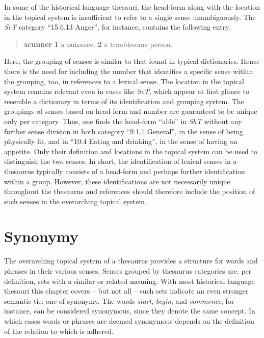 In some of the historical language thesauri, the head-form along with the location in the topical system is insufficient to refer to a single sense unambiguously. The \textit{ScT} category ``15.6.13 Anger'', for instance, contains the following entry:
\begin{quotation} \noindent
	\textbf{scunner} \textbf{1} a nuisance. \textbf{2} a troublesome person.
\end{quotation}
Here, the grouping of senses is similar to that found in typical dictionaries. Hence there is the need for including the number that identifies a specific sense within the grouping, too, in references to a lexical sense. The location in the topical system remains relevant even in cases like \textit{ScT}, which appear at first glance to resemble a dictionary in terms of its identification and grouping system. The groupings of senses based on head-form and number are guaranteed to be unique only per category. Thus, one finds the head-form ``able'' in \textit{ShT} without any further sense division in both category ``9.1.1 General'', in the sense of being physically fit, and in ``10.4 Eating and drinking'', in the sense of having an appetite. Only their definition and locations in the topical system can be used to distinguish the two senses. In short, the identification of lexical senses in a thesaurus typically consists of a head-form and perhaps further identification within a group. However, these identifications are not necessarily unique throughout the thesaurus and references should therefore include the position of such senses in the overarching topical system. 

\section{Synonymy}
\label{sect:Stolk_thes-content:Synonymy}

The overarching topical system of a thesaurus provides a structure for words and phrases in their various senses. %
Senses grouped by thesaurus categories are, per definition, sets with a similar or related meaning. With most historical language thesauri this chapter covers -- but not all -- such sets indicate an even stronger semantic tie: one of synonymy. The words \textit{start}, \textit{begin}, and \textit{commence}, for instance, can be considered synonymous, since they denote the same concept. In which cases words or phrases are deemed synonymous depends on the definition of the relation to which is adhered.

